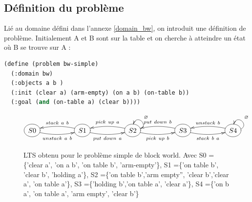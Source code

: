 
\subsection*{Définition du problème}

Lié au domaine défini dans l'annexe \ref{domain_bw}, on introduit une définition de problème. Initialement A et B sont sur la table et on cherche à atteindre un état où B se trouve sur A :

\begin{lstlisting}[language=Lisp,basicstyle=\ttfamily\footnotesize]
(define (problem bw-simple)
  (:domain bw)
  (:objects a b )
  (:init (clear a) (arm-empty) (on a b) (on-table b))
  (:goal (and (on-table a) (clear b))))
    \end{lstlisting}




\begin{figure}[h!]
    \[
        \xymatrix @R=0.1em @C=5em {
            *++[o][F-]{S0} \ar@/_/[r]_{unstack\ a\ b} & 
            *++[o][F-]{S1} \ar@/_/[l]_{stack\ a\ b} \ar@/_/[r]_{put\ down\ a} &
            *++[o][F-]{S2} \ar@/_/[l]_{pick\ up\ a} \ar@/_/[r]_{pick\ up\ b} \ar@(r,u)[]_{\varnothing} &
            *++[o][F-]{S3} \ar@/_/[l]_{put\ down\ b} \ar@/_/[r]_{stack\ b\ a} &
            *++[o][F-]{S4} \ar@/_/[l]_{unstack\ b} \ar@(r,u)[]_{\varnothing}
        }
    \]
    \centering
    \captionsetup{width=0.8\textwidth}
    \caption{LTS obtenu pour le problème simple de block world. Avec S0 =\{'clear a', 'on a b', 'on table b', 'arm-empty'\}, S1 =\{'on table b', 'clear b', 'holding a'\}, S2 =\{'on table b','arm empty'', 'clear b','clear a', 'on table a'\}, S3 =\{'holding b','on table a', 'clear a'\}, S4 =\{'on b a', 'on table a', 'arm empty', 'clear b'\}}
    \label{fig:exemple graphe BW}
\end{figure}